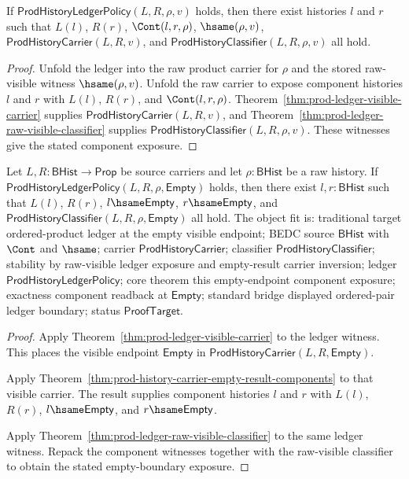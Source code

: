 \begin{theorem}
\label{thm:prod-ledger-component-exposure}
If $\mathsf{ProdHistoryLedgerPolicy}(L,R,\rho,v)$ holds, then there exist histories $l$ and $r$ such that $L(l)$, $R(r)$, $\Cont(l,r,\rho)$, $\hsame(\rho,v)$, $\mathsf{ProdHistoryCarrier}(L,R,v)$, and $\mathsf{ProdHistoryClassifier}(L,R,\rho,v)$ all hold.
\end{theorem}
\begin{proof}
Unfold the ledger into the raw product carrier for $\rho$ and the stored raw-visible witness $\hsame(\rho,v)$. Unfold the raw carrier to expose component histories $l$ and $r$ with $L(l)$, $R(r)$, and $\Cont(l,r,\rho)$. Theorem~\ref{thm:prod-ledger-visible-carrier} supplies $\mathsf{ProdHistoryCarrier}(L,R,v)$, and Theorem~\ref{thm:prod-ledger-raw-visible-classifier} supplies $\mathsf{ProdHistoryClassifier}(L,R,\rho,v)$. These witnesses give the stated component exposure.
\end{proof}

\begin{theorem}
\label{thm:prod-ledger-visible-empty-component-exposure}
Let $L,R:\mathsf{BHist}\to\mathsf{Prop}$ be source carriers and let
$\rho:\mathsf{BHist}$ be a raw history. If
$\mathsf{ProdHistoryLedgerPolicy}(L,R,\rho,\mathsf{Empty})$ holds, then there
exist $l,r:\mathsf{BHist}$ such that $L(l)$, $R(r)$,
$l\hsame\mathsf{Empty}$, $r\hsame\mathsf{Empty}$, and
$\mathsf{ProdHistoryClassifier}(L,R,\rho,\mathsf{Empty})$ all hold. The object
fit is: traditional target ordered-product ledger at the empty visible
endpoint; BEDC source $\mathsf{BHist}$ with $\Cont$ and $\hsame$; carrier
$\mathsf{ProdHistoryCarrier}$; classifier $\mathsf{ProdHistoryClassifier}$;
stability by raw-visible ledger exposure and empty-result carrier inversion;
ledger $\mathsf{ProdHistoryLedgerPolicy}$; core theorem this empty-endpoint
component exposure; exactness component readback at $\mathsf{Empty}$; standard
bridge displayed ordered-pair ledger boundary; status $\mathsf{ProofTarget}$.
\end{theorem}
\begin{proof}
Apply Theorem~\ref{thm:prod-ledger-visible-carrier} to the ledger witness. This
places the visible endpoint $\mathsf{Empty}$ in
$\mathsf{ProdHistoryCarrier}(L,R,\mathsf{Empty})$.

Apply Theorem~\ref{thm:prod-history-carrier-empty-result-components} to that
visible carrier. The result supplies component histories $l$ and $r$ with
$L(l)$, $R(r)$, $l\hsame\mathsf{Empty}$, and $r\hsame\mathsf{Empty}$.

Apply Theorem~\ref{thm:prod-ledger-raw-visible-classifier} to the same ledger
witness. Repack the component witnesses together with the raw-visible
classifier to obtain the stated empty-boundary exposure.
\end{proof}

